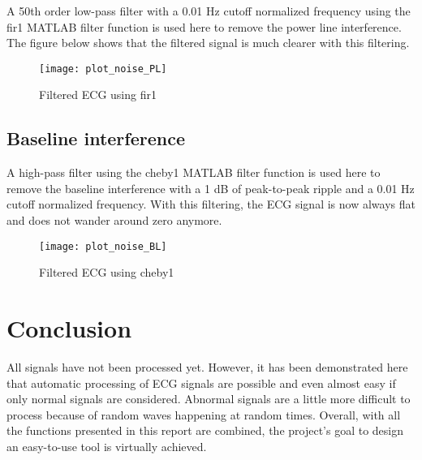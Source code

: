 \documentclass[11pt]{article}
\begin{document}
	A 50th order low-pass filter with a 0.01 Hz cutoff normalized frequency using the \textsf{fir1} MATLAB filter function is used here to remove the power line interference. The figure below shows that the filtered signal is much clearer with this filtering.
	
	\begin{figure}[H]
	\centering
	\texttt{[image: plot\_noise\_PL]}
	\caption{Filtered ECG using \textsf{fir1}}
	\end{figure}
	
	\subsection{Baseline interference}
	
    	A high-pass filter using the \textsf{cheby1} MATLAB filter function is used here to remove the baseline interference with a 1 dB of peak-to-peak ripple and a 0.01 Hz cutoff normalized frequency. With this filtering, the ECG signal is now always flat and does not wander around zero anymore.
	
	\begin{figure}[H]
	\centering
	\texttt{[image: plot\_noise\_BL]}
	\caption{Filtered ECG using \textsf{cheby1}}
	\end{figure}
	
	\section{Conclusion}
	
	All signals have not been processed yet. However, it has been demonstrated here that automatic processing of ECG signals are possible and even almost easy if only normal signals are considered. Abnormal signals are a little more difficult to process because of random waves happening at random times. Overall, with all the functions presented in this report are combined, the project's goal to design an easy-to-use tool is virtually achieved. 
	
\end{document}
